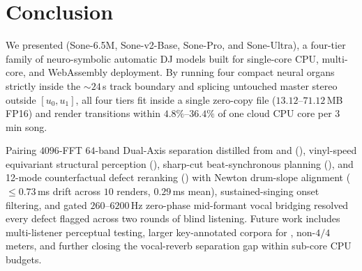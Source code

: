 \section{Conclusion}
\label{sec:conclusion}

We presented \sone{} (Sone-6.5M, Sone-v2-Base, Sone-Pro, and Sone-Ultra), a four-tier family of neuro-symbolic automatic DJ models built for single-core CPU, multi-core, and WebAssembly deployment. By running four compact neural organs strictly inside the $\sim 24$\,s track boundary and splicing untouched master stereo outside $[u_0, u_1]$, all four tiers fit inside a single zero-copy  file ($13.12$--$71.12$\,MB FP16) and render transitions within $4.8\%$--$36.4\%$ of one cloud CPU core per $3$\,min song.

Pairing $4096$-FFT $64$-band Dual-Axis separation distilled from  and  (), vinyl-speed equivariant structural perception (), sharp-cut beat-synchronous planning (), and 12-mode counterfactual defect reranking () with Newton drum-slope alignment ($\le 0.73$\,ms drift across $10$ renders, $0.29$\,ms mean), sustained-singing onset filtering, and gated $260$--$6200$\,Hz zero-phase mid-formant vocal bridging resolved every defect flagged across two rounds of blind listening. Future work includes multi-listener perceptual testing, larger key-annotated corpora for , non-$4/4$ meters, and further closing the vocal-reverb separation gap within sub-core CPU budgets.
